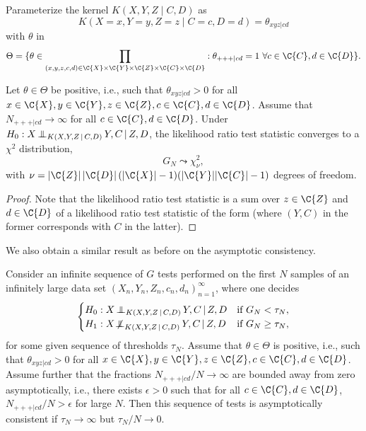 Parameterize the kernel $K(X,Y,Z \mid C,D)$ as
$$K(X=x,Y=y,Z=z \mid C=c,D=d) = \theta_{xyz|cd}$$
with $\theta$ in 
$$\Theta = \{ \theta \in \prod_{(x,y,z,c,d) \in \C{X}\times\C{Y}\times\C{Z}\times\C{C}\times\C{D}} : \theta_{+++|cd} = 1 \ \forall c\in\C{C}, d\in\C{D} \}.$$
\begin{Prp}\label{prp:general_G_test_asymptotics_H0}
  Let $\theta \in \Theta$ be positive, i.e., such that $\theta_{xyz|cd} > 0$ for all $x \in \C{X}, y \in \C{Y}, z \in \C{Z}, c \in \C{C}, d \in \C{D}$.
  Assume that $N_{+++|cd} \to \infty$ for all $c \in \C{C}, d \in \C{D}$.
  Under $H_0 : X \operatorname*{\perp\mkern-11mu\perp}_{K(X,Y,Z \operatorname*{|} C,D)} Y,C \operatorname*{|} Z,D$, the likelihood ratio test statistic  converges
  to a $\chi^2$ distribution,
  $$G_N \leadsto \chi^2_\nu,$$
  with $\nu = |\C{Z}|\,|\C{D}|\,(|\C{X}| - 1)(|\C{Y}||\C{C}| - 1)$ degrees of freedom.
\end{Prp}
\begin{proof}
  Note that the likelihood ratio test statistic  is a sum
  over $z \in \C{Z}$ and $d \in \C{D}$ of a likelihood ratio test statistic of the form 
   (where $(Y,C)$ in the former corresponds with $C$ in the latter). 
\end{proof}
We also obtain a similar result as before on the asymptotic consistency.
\begin{Cor}\label{cor:gen_G_test_consistency}
Consider an infinite sequence of $G$ tests performed on the first $N$ samples of an infinitely large
data set $(X_n,Y_n,Z_n,c_n,d_n)_{n=1}^\infty$,
where one decides
  $$\begin{cases}
    H_0 : X \operatorname*{\perp\mkern-11mu\perp}_{K(X,Y,Z \operatorname*{|} C,D)} Y,C \operatorname*{|} Z,D     & \text{if $G_N < \tau_N$},\\
    H_1 : X \operatorname*{\not\mkern-2mu\perp\mkern-11mu\perp}_{K(X,Y,Z \operatorname*{|} C,D)} Y,C \operatorname*{|} Z,D & \text{if $G_N \ge \tau_N$,}
  \end{cases}$$
for some given sequence of thresholds $\tau_N$.
Assume that $\theta \in \Theta$ is positive, i.e., such that $\theta_{xyz|cd} > 0$ for all $x \in \C{X}, y \in \C{Y}, z \in \C{Z}, c \in \C{C}, d \in \C{D}$.
Assume further that the fractions $N_{+++|cd} / N \to \infty$ are bounded away from zero asymptotically,
i.e., there exists $\epsilon > 0$ such that for all $c \in \C{C}, d \in \C{D}$, $N_{+++|cd} / N > \epsilon$ for large $N$.
Then this sequence of tests is asymptotically consistent if $\tau_N \to \infty$ but $\tau_N / N \to 0$.
\end{Cor}

